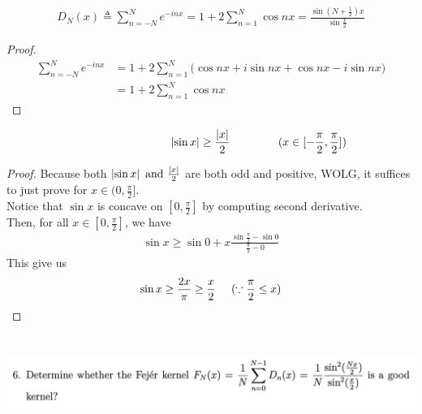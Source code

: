 \documentclass{report}
\begin{document}
\begin{lemma}
\label{Dkernel variant}
\begin{align*}
D_N(x)\triangleq \sum_{n=-N}^{N}e^{-inx}=1+2\sum_{n=1}^N \cos nx = \frac{\sin (N+\frac{1}{2})x}{\sin \frac{x}{2}}
\end{align*}
\end{lemma}
\begin{proof}
\begin{align*}
\sum_{n=-N}^{N}e^{-i nx}&=1+2\sum_{n=1}^N \big(\cos nx+ i \sin nx + \cos nx - i \sin nx \big)\\
&=1+2\sum_{n=1}^N \cos nx
\end{align*}
\end{proof}
\begin{lemma}
\label{sinx/2}
\begin{align*}
\hspace{3cm}\abso{\sin x}\geq \frac{\abso{x}}{2}\hspace{1.5cm}(x\in  [-\frac{\pi}{2},\frac{\pi}{2}] )
\end{align*}
\end{lemma}
\begin{proof}
Because both $\left|\sin x\right|\text{ and }\frac{\left|x\right|}{2}$ are both odd and positive, WOLG, it suffices to just prove  for $x \in (0,\frac{\pi}{2}]$.\\

Notice that $\sin x$ is concave on $[0,\frac{\pi}{2}]$ by computing second derivative.\\

Then, for all $x\in [0,\frac{\pi}{2}]$, we have
\begin{align*}
\sin x \geq \sin 0+ x \frac{\sin \frac{\pi}{2}- \sin 0}{\frac{\pi}{2}-0}
\end{align*}
This give us 
\begin{align*}
\sin x\geq \frac{2x}{\pi}\geq \frac{x}{2}\hspace{0.5cm}(\because \frac{\pi}{2}\leq x)
\end{align*}
\end{proof}
\begin{question}{}{}
\includegraphics[height=3cm,width=18cm]{hw3q6}
\end{question}
\end{document}

